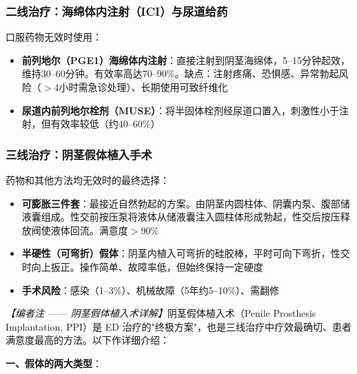 \subsubsection{二线治疗：海绵体内注射（ICI）与尿道给药}

口服药物无效时使用：
\begin{itemize}[leftmargin=2cm]
	\item \textbf{前列地尔（PGE1）海绵体内注射}：直接注射到阴茎海绵体，5--15分钟起效，维持30--60分钟。有效率高达70--90\%。缺点：注射疼痛、恐惧感、异常勃起风险（$>$4小时需急诊处理）、长期使用可致纤维化
	\item \textbf{尿道内前列地尔栓剂（MUSE）}：将半固体栓剂经尿道口置入，刺激性小于注射，但有效率较低（约40--60\%）
\end{itemize}

\subsubsection{三线治疗：阴茎假体植入手术}
\label{subsec:penile_prosthesis}

药物和其他方法均无效时的最终选择：
\begin{itemize}[leftmargin=2cm]
	\item \textbf{可膨胀三件套}：最接近自然勃起的方案。由阴茎内圆柱体、阴囊内泵、腹部储液囊组成。性交前按压泵将液体从储液囊注入圆柱体形成勃起，性交后按压释放阀使液体回流。满意度$>$90\%
	\item \textbf{半硬性（可弯折）假体}：阴茎内植入可弯折的硅胶棒，平时可向下弯折，性交时向上扳正。操作简单、故障率低，但始终保持一定硬度
	\item \textbf{手术风险}：感染（1--3\%）、机械故障（5年约5--10\%）、需翻修
\end{itemize}

\noindent\textit{【编者注 —— 阴茎假体植入术详解】}阴茎假体植入术（Penile Prosthesis Implantation, PPI）是 ED 治疗的"终极方案"，也是三线治疗中疗效最确切、患者满意度最高的方法。以下作详细介绍：

\vspace{0.5em}
\noindent\textbf{一、假体的两大类型}：

